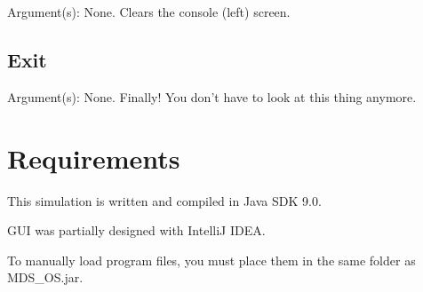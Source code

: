 \documentclass[10pt]{article}
\begin{document}
Argument(s): None. Clears the console (left) screen.

\subsection{Exit}

Argument(s): None. Finally! You don't have to look at this thing anymore.

\section{Requirements}

This simulation is written and compiled in Java SDK 9.0.

GUI was partially designed with IntelliJ IDEA.

To manually load program files, you must place them in the same folder as MDS\_OS.jar.
\end{document}
